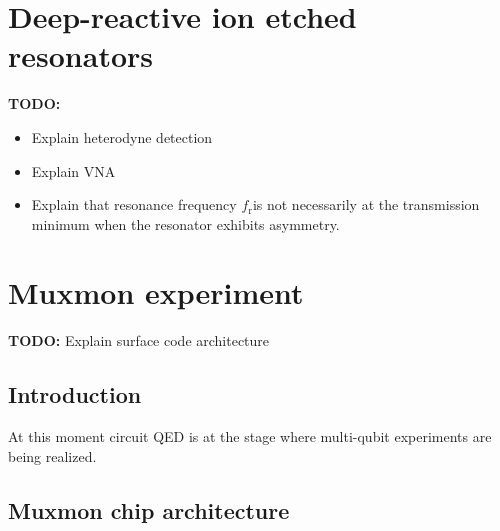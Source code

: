 \documentclass[12pt]{report}
\newcommand{\fres}{$f_\text{r}$}
\begin{document}
\part{Deep-reactive ion etched resonators}

\textbf{TODO:}
\begin{itemize}
  \item Explain heterodyne detection
  \item Explain VNA
  \item Explain that resonance frequency \fres is not necessarily at the transmission minimum when the resonator exhibits asymmetry.
\end{itemize}





\part{Muxmon experiment}

  \textbf{TODO:} Explain surface code architecture



  \chapter*{Introduction}

    At this moment circuit QED is at the stage where multi-qubit experiments are being realized.



  \chapter{Muxmon chip architecture}
\end{document}
